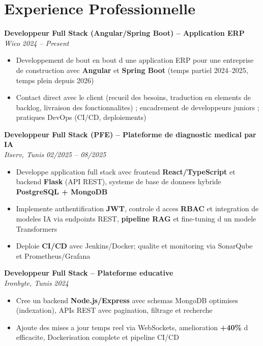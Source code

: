 \documentclass[10pt,a4paper]{article}
\begin{document}
\vspace{6pt}

\section*{Experience Professionnelle}
{\small

\textbf{Developpeur Full Stack (Angular/Spring Boot) -- Application ERP}\\[1pt]
\textit{Wico} \hfill \textit{2024 -- Present}
\begin{itemize}
  \item Developpement de bout en bout d une application ERP pour une entreprise de construction avec \textbf{Angular} et \textbf{Spring Boot} (temps partiel 2024--2025, temps plein depuis 2026)
  \item Contact direct avec le client (recueil des besoins, traduction en elements de backlog, livraison des fonctionnalites) ; encadrement de developpeurs juniors ; pratiques DevOps (CI/CD, deploiements)
\end{itemize}

\vspace{3pt}
\textbf{Developpeur Full Stack (PFE) -- Plateforme de diagnostic medical par IA}\\[1pt]
\textit{Itserv, Tunis} \hfill \textit{02/2025 -- 08/2025}
\begin{itemize}
  \item Developpe application full stack avec frontend \textbf{React/TypeScript} et backend \textbf{Flask} (API REST), systeme de base de donnees hybride \textbf{PostgreSQL + MongoDB}
  \item Implemente authentification \textbf{JWT}, controle d acces \textbf{RBAC} et integration de modeles IA via endpoints REST, \textbf{pipeline RAG} et fine-tuning d un modele Transformers
  \item Deploie \textbf{CI/CD} avec Jenkins/Docker; qualite et monitoring via SonarQube et Prometheus/Grafana
\end{itemize}

\vspace{3pt}
\textbf{Developpeur Full Stack -- Plateforme educative}\\[1pt]
\textit{Ironbyte, Tunis} \hfill \textit{2024}
\begin{itemize}
  \item Cree un backend \textbf{Node.js/Express} avec schemas MongoDB optimises (indexation), APIs REST avec pagination, filtrage et recherche
  \item Ajoute des mises a jour temps reel via WebSockets, amelioration \textbf{+40\%} d efficacite, Dockerisation complete et pipeline CI/CD
\end{itemize}

}
\end{document}
